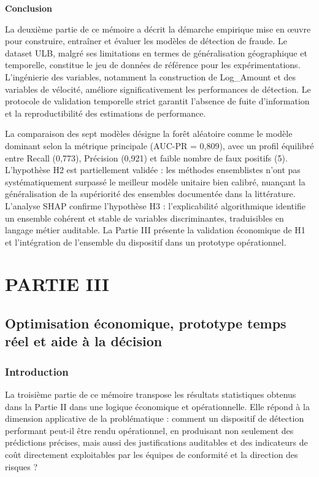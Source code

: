 \textbf{Conclusion }

La deuxième partie de ce mémoire a décrit la démarche empirique mise en œuvre pour construire, entraîner et évaluer les modèles de détection de fraude. Le dataset ULB, malgré ses limitations en termes de généralisation géographique et temporelle, constitue le jeu de données de référence pour les expérimentations. L'ingénierie des variables, notamment la construction de Log\_Amount et des variables de vélocité, améliore significativement les performances de détection. Le protocole de validation temporelle strict garantit l'absence de fuite d'information et la reproductibilité des estimations de performance.

La comparaison des sept modèles désigne la forêt aléatoire comme le modèle dominant selon la métrique principale (AUC-PR = 0,809), avec un profil équilibré entre Recall (0,773), Précision (0,921) et faible nombre de faux positifs (5). L'hypothèse H2 est partiellement validée : les méthodes ensemblistes n'ont pas systématiquement surpassé le meilleur modèle unitaire bien calibré, nuançant la généralisation de la supériorité des ensembles documentée dans la littérature. L'analyse SHAP confirme l'hypothèse H3 : l'explicabilité algorithmique identifie un ensemble cohérent et stable de variables discriminantes, traduisibles en langage métier auditable. La Partie III présente la validation économique de H1 et l'intégration de l'ensemble du dispositif dans un prototype opérationnel.

\part{PARTIE III}

\chapter*{Optimisation économique, prototype temps réel et aide à la décision}

\section*{Introduction}

La troisième partie de ce mémoire transpose les résultats statistiques obtenus dans la Partie II dans une logique économique et opérationnelle. Elle répond à la dimension applicative de la problématique : comment un dispositif de détection performant peut-il être rendu opérationnel, en produisant non seulement des prédictions précises, mais aussi des justifications auditables et des indicateurs de coût directement exploitables par les équipes de conformité et la direction des risques ?


